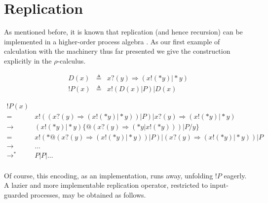 \documentclass[]{amsart}
\makeatletter
\newcommand{\lpquote}{\ulcorner}
\newcommand{\rpquote}{\urcorner}
\newcommand{\id}[1]{\texttt{#1}}
\newcommand{\juxtap}{\mathbin{\id{|}}}
\newcommand{\concat}{\Rightarrow}
\newcommand{\binpar}[2]{#1 \juxtap #2}
\newcommand{\outputp}[2]{#1 ! ( * #2 )}
\newcommand{\prefix}[3]{#1 ? ( #2 ) \concat #3}
\newcommand{\lift}[2]{#1 ! ( #2 )}
\newcommand{\quotep}[1]{@#1}
\newcommand{\dropn}[1]{*#1}
\newcommand{\bangp}[1]{\id{!} #1}
\newcommand{\substn}[2]{\id{\{} #1 / #2 \id{\}}}
\newcommand{\red}{\rightarrow}
\theoremstyle{definition}
\theoremstyle{remark}
\numberwithin{equation}{subsection}
\newcommand{\rhoc}{$\rho$-calculus}
\makeatother
\begin{document}
\section{Replication}

As mentioned before, it is known that replication (and hence
recursion) can be implemented in a higher-order process algebra
\cite{SangiorgiWalker}. As our first example of calculation with the
machinery thus far presented we give the construction explicitly in
the {\rhoc}.


\begin{eqnarray*}
	D(x) & \triangleq & \prefix{x}{y}{(\binpar{\outputp{x}{y}}{\dropn{y}})} \\
	\bangp{P}(x) & \triangleq & \binpar{\lift{x}{\binpar{D(x)}{P}}}{D(x)}
\end{eqnarray*}

\begin{eqnarray*}
	\bangp{P}(x) & & \\
	=
	& \lift{x}{(\prefix{x}{y}{(\outputp{x}{y} \juxtap \dropn{y})) \juxtap P}} 
	      \juxtap \prefix{x}{y}{(\outputp{x}{y} \juxtap \dropn{y})} & \\
	\red
	& (\outputp{x}{y} \juxtap \dropn{y})\substn{\quotep{(\prefix{x}{y}{(\dropn{y} \juxtap \outputp{x}{y})) \juxtap P}}}{y} & \\
	=
	& \outputp{x}{\quotep{(\prefix{x}{y}{(\outputp{x}{y} \juxtap \dropn{y})) \juxtap P}}}
	  \juxtap {(\prefix{x}{y}{(\outputp{x}{y} \juxtap \dropn{y})) \juxtap P}} & \\
	\red
	& \ldots & \\
	\red^*
	& P \juxtap P \juxtap \ldots & \\
\end{eqnarray*}

Of course, this encoding, as an implementation, runs away, unfolding
$\bangp{P}$ eagerly. A lazier and more implementable replication
operator, restricted to input-guarded processes, may be obtained as follows.
\end{document}
